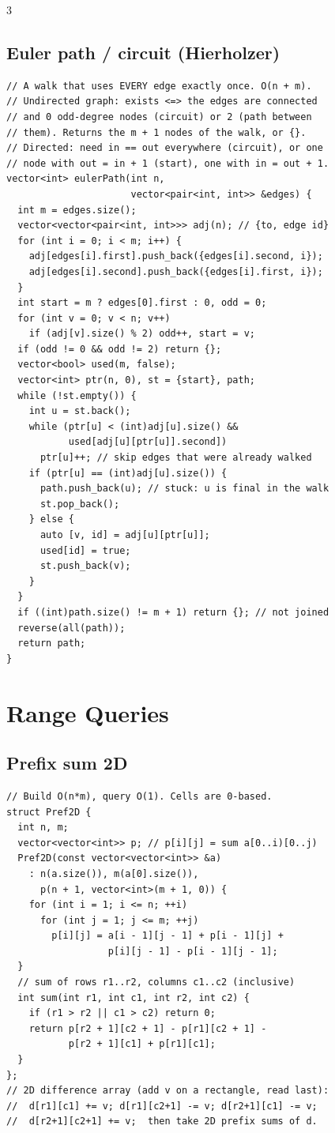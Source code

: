 \documentclass[8pt, a4paper]{article}
\begin{document}
\begin{multicols*}{3}
\subsection{Euler path / circuit (Hierholzer)}
\begin{lstlisting}
// A walk that uses EVERY edge exactly once. O(n + m).
// Undirected graph: exists <=> the edges are connected
// and 0 odd-degree nodes (circuit) or 2 (path between
// them). Returns the m + 1 nodes of the walk, or {}.
// Directed: need in == out everywhere (circuit), or one
// node with out = in + 1 (start), one with in = out + 1.
vector<int> eulerPath(int n,
                      vector<pair<int, int>> &edges) {
  int m = edges.size();
  vector<vector<pair<int, int>>> adj(n); // {to, edge id}
  for (int i = 0; i < m; i++) {
    adj[edges[i].first].push_back({edges[i].second, i});
    adj[edges[i].second].push_back({edges[i].first, i});
  }
  int start = m ? edges[0].first : 0, odd = 0;
  for (int v = 0; v < n; v++)
    if (adj[v].size() % 2) odd++, start = v;
  if (odd != 0 && odd != 2) return {};
  vector<bool> used(m, false);
  vector<int> ptr(n, 0), st = {start}, path;
  while (!st.empty()) {
    int u = st.back();
    while (ptr[u] < (int)adj[u].size() &&
           used[adj[u][ptr[u]].second])
      ptr[u]++; // skip edges that were already walked
    if (ptr[u] == (int)adj[u].size()) {
      path.push_back(u); // stuck: u is final in the walk
      st.pop_back();
    } else {
      auto [v, id] = adj[u][ptr[u]];
      used[id] = true;
      st.push_back(v);
    }
  }
  if ((int)path.size() != m + 1) return {}; // not joined
  reverse(all(path));
  return path;
}
\end{lstlisting}
\section{Range Queries}
\subsection{Prefix sum 2D}
\begin{lstlisting}
// Build O(n*m), query O(1). Cells are 0-based.
struct Pref2D {
  int n, m;
  vector<vector<int>> p; // p[i][j] = sum a[0..i)[0..j)
  Pref2D(const vector<vector<int>> &a)
    : n(a.size()), m(a[0].size()),
      p(n + 1, vector<int>(m + 1, 0)) {
    for (int i = 1; i <= n; ++i)
      for (int j = 1; j <= m; ++j)
        p[i][j] = a[i - 1][j - 1] + p[i - 1][j] +
                  p[i][j - 1] - p[i - 1][j - 1];
  }
  // sum of rows r1..r2, columns c1..c2 (inclusive)
  int sum(int r1, int c1, int r2, int c2) {
    if (r1 > r2 || c1 > c2) return 0;
    return p[r2 + 1][c2 + 1] - p[r1][c2 + 1] -
           p[r2 + 1][c1] + p[r1][c1];
  }
};
// 2D difference array (add v on a rectangle, read last):
//  d[r1][c1] += v; d[r1][c2+1] -= v; d[r2+1][c1] -= v;
//  d[r2+1][c2+1] += v;  then take 2D prefix sums of d.
\end{lstlisting}

\end{multicols*}
\end{document}
